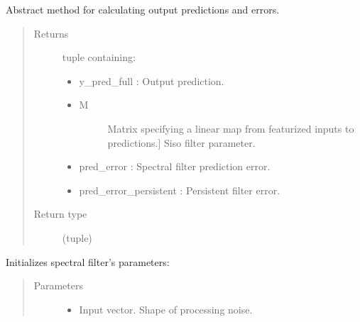 \documentclass[letterpaper,10pt,english]{sphinxmanual}
\begin{document}
\begin{fulllineitems}
\begin{fulllineitems}
\label{\detokenize{LDS.LDS.filters:LDS.LDS.filters.wave_filtering_siso_abs.WaveFilteringSisoAbs.predict}}
\sphinxAtStartPar
Abstract method for calculating output predictions and errors.
\begin{quote}\begin{description}
\item[{Returns}] \leavevmode
\sphinxAtStartPar

\sphinxAtStartPar
tuple containing:
\begin{itemize}
\item {} 
\sphinxAtStartPar
y\_pred\_full           : Output prediction.

\item {} \begin{description}
\item[{M}] \leavevmode{[}Matrix specifying a linear map from featurized inputs to predictions.{]}
\sphinxAtStartPar
Siso filter parameter.

\end{description}

\item {} 
\sphinxAtStartPar
pred\_error            : Spectral filter prediction error.

\item {} 
\sphinxAtStartPar
pred\_error\_persistent : Persistent filter error.

\end{itemize}


\item[{Return type}] \leavevmode
\sphinxAtStartPar
(tuple)

\end{description}\end{quote}

\end{fulllineitems}


\begin{fulllineitems}
\label{\detokenize{LDS.LDS.filters:LDS.LDS.filters.wave_filtering_siso_abs.WaveFilteringSisoAbs.var_calc}}
\sphinxAtStartPar
Initializes spectral filter’s parameters:
\begin{quote}\begin{description}
\item[{Parameters}] \leavevmode\begin{itemize}
\item {} 
\sphinxAtStartPar
{} \textendash{} Input vector. Shape of processing noise.


\end{itemize}
\end{description}
\end{quote}
\end{fulllineitems}
\end{fulllineitems}
\end{document}
